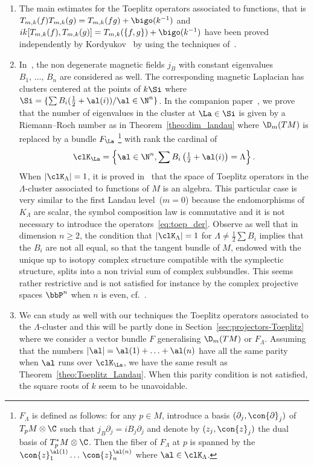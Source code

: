\begin{rema}\leavevmode \label{sec:comp_Yuri}
\begin{enumerate}
\item\label{rema1.5.1}  The main estimates for the Toeplitz operators associated to functions, that is $T_{m,k} (f) T_{m,k} (g) = T_{m,k} (fg) + \bigo (k^{-1})$ and $ik [T_{m,k} (f), T_{m,k} (g)]= T_{m,k} (\{ f, g \}) + \bigo (k^{-1})$ have been proved independently by Kordyukov~\cite{Yuri_2} by using the techniques of~\cite{MaMa}.
\item \label{rema1.5.2} In~\cite{Yuri_2}, the non degenerate magnetic fields $j_B$ with constant eigenvalues $B_1,\, \ldots,\, B_n$ are considered as well. The corresponding magnetic Laplacian has clusters centered at the points of $k\Si$ where $\Si = \{ \sum B_i (\frac{1}{2} + \al (i)) / \al \in \N^n \}$. In the companion paper~\cite{oim_copain}, we prove that the number of eigenvalues in the cluster at $\La \in \Si$ is given by a Riemann--Roch number as in Theorem~\ref{theo:dim_landau} where $\D_m (TM)$ is replaced by a bundle $F_{\La}$ \footnote{$F_{\Lambda}$ is defined as follows: for any $p \in M$, introduce a basis $(\partial_j, \con{\partial}_j)$ of $T_pM \otimes \C$ such that $j_B
\partial_j = i B_j \partial_j$ and denote by $(z_j, \con{z}_j)$ the dual basis of $T^*_pM \otimes \C$. Then the fiber of $F_{\Lambda}$ at $p$ is spanned by the $\con{z}_1^{\al(1)}
\ldots\, \con{z}_n^{\al (n)}$ where $\al \in \clK_{\Lambda}$. } with rank the cardinal of
\[
\clK_{\La} = \left\{ \al \in \N^n, \sum B_i
\left(\tfrac{1}{2} + \al (i)\right) = \Lambda \right\}.
\]
When $|\clK_{\Lambda} | =1$, it is proved in~\cite{Yuri_2} that the space of Toeplitz operators in the $\Lambda$-cluster associated to functions of $M$ is an algebra. This particular case is very similar to the first Landau level~($m=0$) because the endomorphisms of $K_{\Lambda}$ are scalar, the symbol composition law is commutative and it is not necessary to introduce the operators~\eqref{eq:toep_der}. Observe as well that in dimension $n \geqslant 2$, the condition that $|\clK_{\Lambda}| =1$ for $\Lambda \neq \frac{1}{2} \sum B_i$ implies that the $B_i$ are not all equal, so that the tangent bundle of $M$, endowed with the unique up to isotopy complex structure compatible with the symplectic structure, splits into a non trivial sum of complex subbundles. This seems rather restrictive and is not satisfied for instance by the complex projective spaces $\bbP^n$ when $n$ is even, cf.~\cite{split}.

\item\label{rema1.5.3} We can study as well with our techniques the Toeplitz operators associated to the $\Lambda$-cluster and this will be partly done in Section~\ref{sec:projectors-Toeplitz} where we consider a vector bundle $F$ generalising $\D_m (TM)$ or $F_{\Lambda}$. Assuming that the numbers $|\al| = \al (1) + \ldots + \al (n)$ have all the same parity when $\al$ runs over $\clK_{\La}$, we have the same result as Theorem~\ref{theo:Toeplitz_Landau}. When this parity condition is not satisfied, the square roots of $k$ seem to be unavoidable.


\end{enumerate}
\end{rema}
